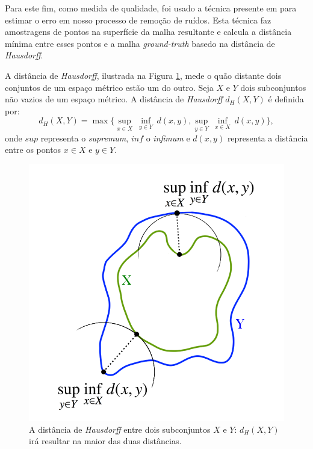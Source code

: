 Para este fim, como medida de qualidade, foi usado a técnica presente em \cite{cignoni1998metro} para estimar o erro em nosso processo de remoção de ruídos. Esta técnica faz amostragens de pontos na superfície da malha resultante e calcula a distância mínima entre esses pontos e a malha \textit{ground-truth} basedo na distância de \textit{Hausdorff}.

A distância de \textit{Hausdorff}, ilustrada na Figura \ref{fig:hausdorffdistance}, mede o quão distante dois conjuntos de um espaço métrico estão um do outro. Seja $X$ e $Y$ dois subconjuntos não vazios de um espaço métrico. A distância de \textit{Hausdorff} $d_H(X,Y)$ é definida por:
\begin{equation}
	d_H(X,Y) = \max \{ {\sup_{x \in X}} \: {\inf_{y \in Y}} \: d(x,y), \underset{y \in Y}{\sup} \: \underset{x \in X}{\inf} \: d(x,y) \},
\end{equation}
onde $sup$ representa o \textit{supremum}, $inf$ o \textit{infimum} e $d(x,y)$ representa a distância entre os pontos $x \in X$ e $y \in Y$.

\begin{figure}[!h]
\captionsetup{width=\linewidth}
\centering
\includegraphics[scale=0.4]{figuras/Hausdorff_final.png}
\caption{A distância de \textit{Hausdorff} entre dois subconjuntos $X$ e $Y$: $d_H(X,Y)$ irá resultar na maior das duas distâncias.}
\label{fig:hausdorffdistance}
\end{figure}

